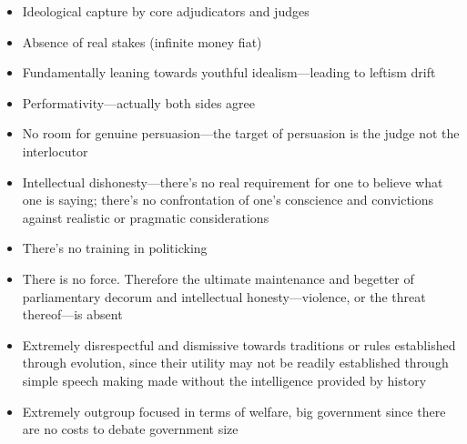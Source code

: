 \begin{itemize}
    \item Ideological capture by core adjudicators and judges
    \item Absence of real stakes (infinite money fiat)
    \item Fundamentally leaning towards youthful idealism—leading to leftism drift
    \item Performativity—actually both sides agree 
    \item No room for genuine persuasion—the target of persuasion is the judge not the interlocutor
    \item Intellectual dishonesty—there's no real requirement for one to believe what one is saying; there's no confrontation of one's conscience and convictions against realistic or pragmatic considerations
    \item There's no training in politicking
    \item There is no force. Therefore the ultimate maintenance and begetter of parliamentary decorum and intellectual honesty—violence, or the threat thereof—is absent
    \item Extremely disrespectful and dismissive towards traditions or rules established through evolution, since their utility may not be readily established through simple speech making made without the intelligence provided by history 
    
    \item Extremely outgroup focused in terms of welfare, big government since there are no costs to debate government size
    
\end{itemize}


